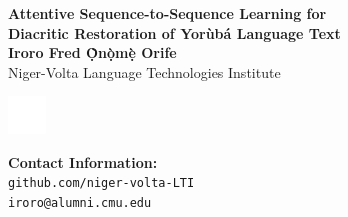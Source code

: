 \documentclass[a0,landscape]{a0poster}
\begin{document}


\begin{minipage}[b]{0.55\linewidth}
\veryHuge \color{NavyBlue} \textbf{Attentive Sequence-to-Sequence Learning for \\
  Diacritic Restoration of Yor{\`u}b{\'a} Language Text} \color{Black}\\ %
  
\huge \textbf{Iroro Fred \d{\`O}n\d{\`o}m\d{\`e} Orife}\\ %
\huge Niger-Volta Language Technologies Institute\\ %
\end{minipage}
%
\begin{minipage}[b]{0.25\linewidth}
\includegraphics[width=1cm]{logo.png} %
\end{minipage}
%
\begin{minipage}[b]{0.25\linewidth}
\color{DarkSlateGray}\Large \textbf{Contact Information:}\\
\texttt{github.com/niger-volta-LTI} \\
\texttt{iroro@alumni.cmu.edu}\\ %
\end{minipage}
%

\vspace{1cm} %

\end{document}
